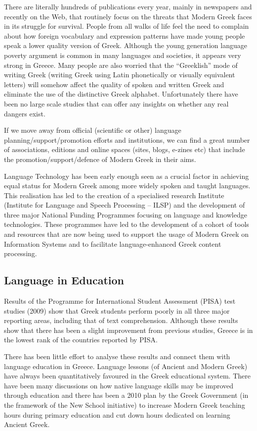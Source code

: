 \begin{multicols}{2}
There are literally hundreds of publications every year, mainly in newspapers and recently on the Web, that routinely focus on the threats that Modern Greek faces in its struggle for survival. People from all walks of life feel the need to complain about how foreign vocabulary and expression patterns have made young people speak a lower quality version of Greek. Although the young generation language poverty argument is common in many languages and societies, it appears very strong in Greece. Many people are also worried that the “Greeklish” mode of writing Greek (writing Greek using Latin phonetically or visually equivalent letters) will somehow affect the quality of spoken and written Greek and eliminate the use of the distinctive Greek alphabet. Unfortunately there have been no large scale studies that can offer any insights on whether any real dangers exist.

If we move away from official (scientific or other) language planning/support/promotion efforts and institutions, we can find a great number of associations, editions and online spaces (sites, blogs, e-zines etc) that include the promotion/support/defence of Modern Greek in their aims.

Language Technology has been early enough seen as a crucial factor in achieving equal status for Modern Greek among more widely spoken and taught languages. This realisation has led to the creation of a specialised research Institute (Institute for Language and Speech Processing – ILSP) and the development of three major National Funding Programmes focusing on language and knowledge technologies. These programmes have led to the development of a cohort of tools and resources that are now being used to support the usage of Modern Greek on Information Systems and to facilitate language-enhanced Greek content processing.

\subsection{Language in Education}

Results of the Programme for International Student Assessment (PISA) test studies (2009) \cite{Pisa2} show that Greek students perform poorly in all three major reporting areas, including that of text comprehension. Although these results show that there has been a slight improvement from previous studies, Greece is in the lowest rank of the countries reported by PISA.

There has been little effort to analyse these results and connect them with language education in Greece. Language lessons (of Ancient and Modern Greek) have always been quantitatively favoured in the Greek educational system. There have been many discussions on how native language skills may be improved through education and there has been a 2010 plan by the Greek Government (in the framework of the New School initiative) to increase Modern Greek teaching hours during primary education and cut down hours dedicated on learning Ancient Greek.


\end{multicols}
